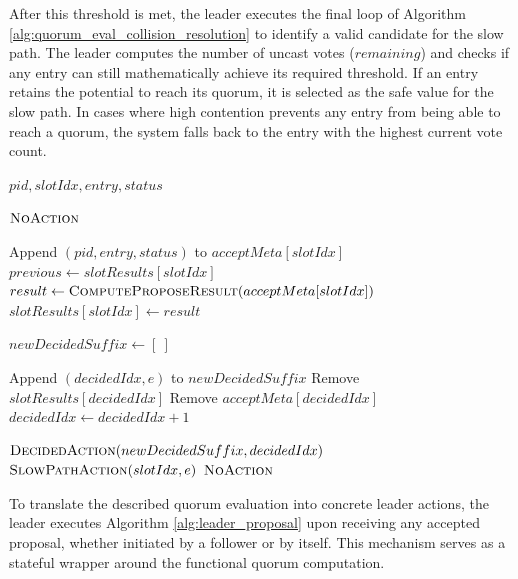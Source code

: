 After this threshold is met, the leader executes the final loop of Algorithm \ref{alg:quorum_eval_collision_resolution} to identify a valid candidate for the slow path. The leader computes the number of uncast votes ($remaining$) and checks if any entry can still mathematically achieve its required threshold. If an entry retains the potential to reach its quorum, it is selected as the safe value for the slow path. In cases where high contention prevents any entry from being able to reach a quorum, the system falls back to the entry with the highest current vote count.

\begin{algorithm}[t]
\caption{Leader Proposal Processing}
\label{alg:leader_proposal}

\begin{algorithmic}[1]

{$pid, slotIdx, entry, status$}

    \State \Return $\textsc{NoAction}$
\EndIf

\State Append $(pid, entry, status)$ to $\textit{acceptMeta}[slotIdx]$
\State $previous \gets \textit{slotResults}[slotIdx]$
\State $result \gets \Call{ComputeProposeResult}{acceptMeta[slotIdx]}$
\State $\textit{slotResults}[slotIdx] \gets result$


    \State $newDecidedSuffix \gets [\ ]$

        \State Append $(decidedIdx,e)$ to $newDecidedSuffix$
        \State Remove $\textit{slotResults}[decidedIdx]$
        \State Remove $\textit{acceptMeta}[decidedIdx]$
        \State $decidedIdx \gets decidedIdx+1$

    \EndWhile

    \State \Return $\textsc{DecidedAction}(newDecidedSuffix,decidedIdx)$
    \State \Return $\textsc{SlowPathAction}(slotIdx,e)$
\Else
    \State \Return $\textsc{NoAction}$
\EndIf

\EndProcedure

\end{algorithmic}
\end{algorithm}

To translate the described quorum evaluation into concrete leader actions, the leader executes Algorithm \ref{alg:leader_proposal} upon receiving any accepted proposal, whether initiated by a follower or by itself. This mechanism serves as a stateful wrapper around the functional quorum computation.

